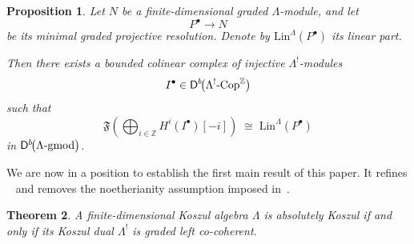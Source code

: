 \documentclass[11pt]{article}
\newtheorem{theorem}{Theorem}[section]
\newtheorem{proposition}[theorem]{Proposition}
\theoremstyle{definition}
\theoremstyle{remark}
\begin{document}
\begin{proposition}
Let \(N\) be a finite-dimensional graded \(\Lambda\)-module, and let
\[
P^{\bullet} \longrightarrow N
\]
be its minimal graded projective resolution. Denote by \(\mathrm{Lin}^{\Lambda}(P^{\bullet})\) its linear part.

Then there exists a bounded colinear complex of injective \(\Lambda^{!}\)-modules
\[
I^{\bullet} \in \mathsf{D}^{b}\!\bigl(\Lambda^{!}\textup{-Cop}^{\mathbb{Z}}\bigr)
\]
such that
\[
\mathfrak{F}\!\left(\bigoplus_{i \in \mathbb{Z}} H^{i}(I^{\bullet})[-i]\right)
\;\cong\;
\mathrm{Lin}^{\Lambda}(P^{\bullet})
\]
in \(\mathsf{D}^{b}\!\bigl(\Lambda\textup{-gmod}\bigr)\).
\end{proposition}
\medskip

We are now in a position to establish the first main result of this paper. It refines ~\cite[Proposition~4.8]{27} and removes the noetherianity assumption imposed in~\cite[Theorem~4.5]{19}.

\begin{theorem}
A finite-dimensional Koszul algebra \(\Lambda\) is absolutely Koszul if and only if its Koszul dual \(\Lambda^{!}\) is graded left co-coherent.
\end{theorem}
\end{document}
